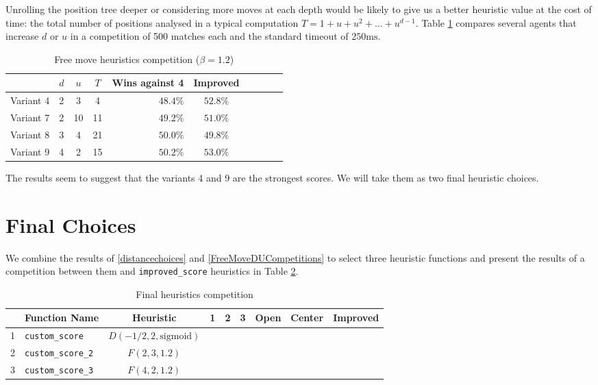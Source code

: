 \documentclass[oneside]{article}   	%
\begin{document}
Unrolling the position tree deeper or considering more moves at each depth would be likely to give us a better heuristic value at the cost of time: the total number of positions analysed in a typical computation $T = 1+u+u^2+\dots+u^{d-1}$. Table \ref{FreeMoveDUCompetition} compares several agents that increase $d$ or $u$ in a competition of 500 matches each and the standard timeout of $250\textrm{ms}$.

\begin{table}[htp]
\caption{Free move heuristics competition ($\beta = 1.2$)}
\begin{center}
\begin{tabular}{c|cc|c|rccccc}
   & $d$ & $u$ & $T$  & Wins against 4 & Improved \\
   \hline
 Variant 4 &    2 & 3   & 4   & $48.4\%$ & $52.8\%$ \\
 Variant 7 &    2 & 10  & 11  & $49.2\%$ & $51.0\%$ \\
 Variant 8 &    3 & 4   & 21  & $50.0\%$ & $49.8\%$ \\
 Variant 9 &    4 & 2   & 15  & $50.2\%$ & $53.0\%$ \\
\end{tabular}
\end{center}
\label{FreeMoveDUCompetition}
\end{table}%

The results seem to suggest that the variants 4 and 9 are the strongest scores. We will take them as two final heuristic choices.



\section{Final Choices}

We combine the results of \ref{distancechoices} and \ref{FreeMoveDUCompetitions} to select three heuristic functions and present the results of a competition between them and \texttt{improved\_score} heuristics in Table \ref{FinalCompetition}.

\begin{table}[htp]
\caption{Final heuristics competition}
\begin{center}
\begin{tabular}{c|lc|cccccc}
   & Function Name & Heuristic & 1 & 2 & 3 & Open & Center & Improved \\
   \hline
1 & \texttt{custom\_score}    & $D(-1/2, 2, \textrm{sigmoid})$ & & & & & &  \\
2 & \texttt{custom\_score\_2} & $F(2, 3, 1.2)$               & & & & & &  \\
3 & \texttt{custom\_score\_3} & $F(4, 2, 1.2)$               & & & & & &  
\end{tabular}
\end{center}
\label{FinalCompetition}
\end{table}%
\end{document}
